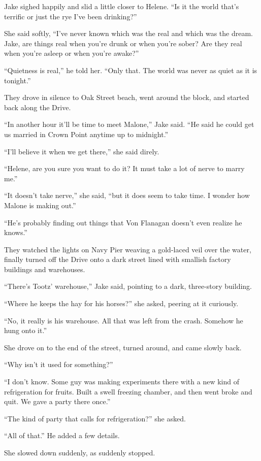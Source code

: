 \documentclass{novel}
\begin{document}
Jake sighed happily and slid a little closer to Helene. “Is it the world that’s terrific or just the rye I’ve been drinking?”

She said softly, “I've never known which was the real and which was the dream. Jake, are things real when you’re drunk or when you’re sober? Are they real when you’re asleep or when you’re awake?”

“Quietness is real,” he told her. “Only that. The world was never as quiet as it is tonight.”

They drove in silence to Oak Street beach, went around the block, and started back along the Drive.

“In another hour it’ll be time to meet Malone,” Jake said. “He said he could get us married in Crown Point anytime up to midnight.”

“I’ll believe it when we get there,” she said direly.

“Helene, are you sure you want to do it? It must take a lot of nerve to marry me.”

“It doesn’t take nerve,” she said, “but it does seem to take time. I wonder how Malone is making out.”

“He’s probably finding out things that Von Flanagan doesn’t even realize he knows.”

They watched the lights on Navy Pier weaving a gold-laced veil over the water, finally turned off the Drive onto a dark street lined with smallish factory buildings and warehouses.

“There’s Tootz’ warehouse,” Jake said, pointing to a dark, three-story building.

“Where he keeps the hay for his horses?” she asked, peering at it curiously.

“No, it really is his warehouse. All that was left from the crash. Somehow he hung onto it.”

She drove on to the end of the street, turned around, and came slowly back.

“Why isn’t it used for something?”

“I don’t know. Some guy was making experiments there with a new kind of refrigeration for fruits. Built a swell freezing chamber, and then went broke and quit. We gave a party there once.”

“The kind of party that calls for refrigeration?” she asked.

“All of that.” He added a few details.

She slowed down suddenly, as suddenly stopped.
\end{document}
